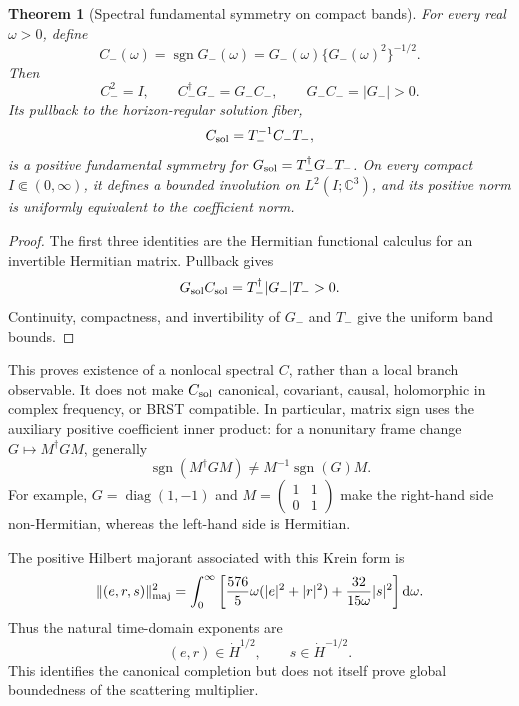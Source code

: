 \documentclass[11pt]{article}
\newtheorem{theorem}{Theorem}[section]
\theoremstyle{definition}
\theoremstyle{remark}
\newcommand{\C}{\mathbb C}
\newcommand{\dd}{\mathrm d}
\begin{document}
\begin{theorem}[Spectral fundamental symmetry on compact bands]
\label{thm:spectral-c}
For every real \(\omega>0\), define
\[
C_-(\omega)
=
\operatorname{sgn}G_-(\omega)
=
G_-(\omega)\{G_-(\omega)^2\}^{-1/2}.
\]
Then
\[
C_-^2=I,\qquad
C_-^\dagger G_-=G_-C_-,
\qquad
G_-C_-=|G_-|>0.
\]
Its pullback to the horizon-regular solution fiber,
\[
C_{\rm sol}=T_-^{-1}C_-T_-,
\]
is a positive fundamental symmetry for
\(G_{\rm sol}=T_-^\dagger G_-T_-\).  On every compact
\(I\Subset(0,\infty)\), it defines a bounded involution on
\(L^2(I;\C^3)\), and its positive norm is uniformly equivalent to the
coefficient norm.
\end{theorem}

\begin{proof}
The first three identities are the Hermitian functional calculus for an
invertible Hermitian matrix.  Pullback gives
\[
G_{\rm sol}C_{\rm sol}
=T_-^\dagger|G_-|T_->0.
\]
Continuity, compactness, and invertibility of \(G_-\) and \(T_-\) give the
uniform band bounds.
\end{proof}

This proves existence of a nonlocal spectral \(C\), rather than a local
branch observable.  It does not make \(C_{\rm sol}\) canonical, covariant,
causal, holomorphic in complex frequency, or BRST compatible.  In
particular, matrix sign uses the auxiliary positive coefficient inner
product: for a nonunitary frame change \(G\mapsto M^\dagger GM\), generally
\[
\operatorname{sgn}(M^\dagger GM)
\ne M^{-1}\operatorname{sgn}(G)M.
\]
For example, \(G=\operatorname{diag}(1,-1)\) and
\(M=\left(\begin{smallmatrix}1&1\\0&1\end{smallmatrix}\right)\) make the
right-hand side non-Hermitian, whereas the left-hand side is Hermitian.

The positive Hilbert majorant associated with this Krein form is
\begin{equation}
\label{eq:majorant}
\|(e,r,s)\|_{\rm maj}^2
=
\int_0^\infty
\left[
\frac{576}{5}\omega(|e|^2+|r|^2)
+\frac{32}{15\omega}|s|^2
\right]\dd\omega.
\end{equation}
Thus the natural time-domain exponents are
\[
(e,r)\in\dot H^{1/2},
\qquad
s\in\dot H^{-1/2}.
\]
This identifies the canonical completion but does not itself prove global
boundedness of the scattering multiplier.
\end{document}
